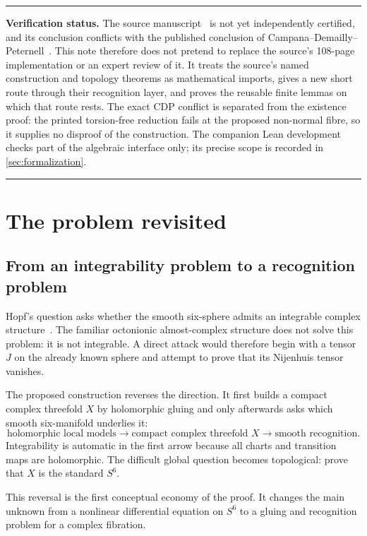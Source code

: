 \documentclass[11pt,reqno]{amsart}
\numberwithin{equation}{section}
\theoremstyle{definition}
\newenvironment{statusnote}{%
  \begin{center}\begin{minipage}{0.94\textwidth}\small\hrule\vspace{0.7em}%
}{%
  \vspace{0.7em}\hrule\end{minipage}\end{center}%
}
\begin{document}
\begin{statusnote}
\textbf{Verification status.}
The source manuscript~\cite{S6} is not yet independently certified, and its conclusion conflicts with the published conclusion of Campana--Demailly--Peternell~\cite{CDP20}. This note therefore does not pretend to replace the source's 108-page implementation or an expert review of it. It treats the source's named construction and topology theorems as mathematical imports, gives a new short route through their recognition layer, and proves the reusable finite lemmas on which that route rests. The exact CDP conflict is separated from the existence proof: the printed torsion-free reduction fails at the proposed non-normal fibre, so it supplies no disproof of the construction. The companion Lean development checks part of the algebraic interface only; its precise scope is recorded in \cref{sec:formalization}.
\end{statusnote}

\section{The problem revisited}\label{sec:problem}

\subsection{From an integrability problem to a recognition problem}

Hopf's question asks whether the smooth six-sphere admits an integrable complex structure~\cite{Hopf}. The familiar octonionic almost-complex structure does not solve this problem: it is not integrable. A direct attack would therefore begin with a tensor $J$ on the already known sphere and attempt to prove that its Nijenhuis tensor vanishes.

The proposed construction reverses the direction. It first builds a compact complex threefold $X$ by holomorphic gluing and only afterwards asks which smooth six-manifold underlies it:
\[
\text{holomorphic local models}
\longrightarrow
\text{compact complex threefold }X
\longrightarrow
\text{smooth recognition}.
\]
Integrability is automatic in the first arrow because all charts and transition maps are holomorphic. The difficult global question becomes topological: prove that $X$ is the standard $S^6$.

This reversal is the first conceptual economy of the proof. It changes the main unknown from a nonlinear differential equation on $S^6$ to a gluing and recognition problem for a complex fibration.
\end{document}
